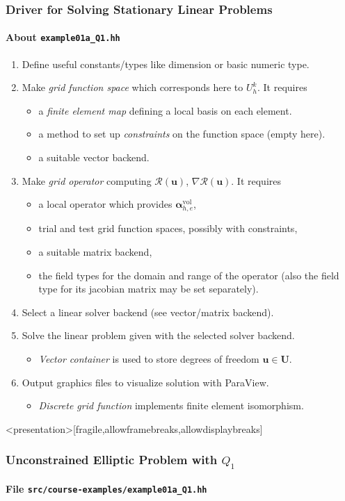 \begin{frame}
\frametitle{Driver for Solving Stationary Linear Problems}
\framesubtitle{About \lstinline{example01a_Q1.hh}}
\begin{enumerate}
\item Define useful constants/types like dimension or basic numeric type.
\item Make \textit{grid function space} which corresponds here to $U_h^k$. It requires
\begin{itemize}
\item a \textit{finite element map} defining a local basis on each element.
\item a method to set up \textit{constraints} on the function space (empty here).
\item a suitable vector backend.
\end{itemize}
\item Make \textit{grid operator} computing $\mathcal{R}(\mathbf{u})$, $\nabla\mathcal{R}(\mathbf{u})$. It requires
\begin{itemize}
\item a local operator which provides $\bm{\alpha}_{h,e}^{\text{vol}}$,
\item trial and test grid function spaces, possibly with constraints,
\item a suitable matrix backend,
\item the field types for the domain and range of the operator (also
  the field type for its jacobian matrix may be set separately).
\end{itemize}
\item Select a linear solver backend (see vector/matrix backend).
\item Solve the linear problem given with the selected solver backend.
\begin{itemize}
\item \textit{Vector container} is used to store degrees of freedom $\mathbf{u}\in\mathbf{U}$.
\end{itemize}
\item Output graphics files to visualize solution with ParaView.
\begin{itemize}
\item \textit{Discrete grid function} implements finite element isomorphism.
\end{itemize}
\end{enumerate}
\end{frame}


\begin{frame}<presentation>[fragile,allowframebreaks,allowdisplaybreaks]
\frametitle<presentation>{Unconstrained Elliptic Problem with $Q_1$}
\framesubtitle<presentation>{File \texttt{src/course-examples/example01a\_Q1.hh}}

\end{frame}



